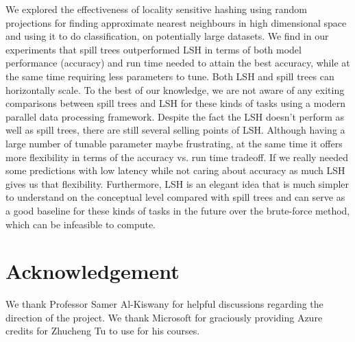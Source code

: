 \documentclass[letterpaper,twocolumn,10pt]{article}
\theoremstyle{definition}
\begin{document}
We explored the effectiveness of locality sensitive hashing using random projections for finding 
approximate nearest neighbours in high dimensional space and using it to do classification, on 
potentially large datasets. We find in our experiments that spill trees outperformed LSH in terms of 
both model performance (accuracy) and run time needed to attain the best accuracy, while at the same 
time requiring less parameters to tune. Both LSH and spill trees can horizontally scale. To the best of 
our knowledge, we are not aware of any exiting comparisons between spill trees and LSH for these 
kinds of tasks using a modern parallel data processing framework. Despite the fact the LSH doesn't 
perform as well as spill trees, there are still several selling points of LSH. Although having a large 
number of tunable parameter maybe frustrating, at the same time it offers more flexibility in terms of 
the accuracy vs. run time tradeoff. If we really needed some predictions with low latency while not 
caring about accuracy as much LSH gives us that flexibility. Furthermore, LSH is an elegant idea that is 
much simpler to understand on the conceptual level compared with spill trees and can serve as a good 
baseline for these kinds of tasks in the future over the brute-force method, which can be infeasible to 
compute.

\section*{Acknowledgement}
We thank Professor Samer Al-Kiswany for helpful discussions regarding the direction 
of the project. We thank Microsoft for graciously providing Azure credits for 
Zhucheng Tu to use for his courses.
{\footnotesize 
}
\end{document}
